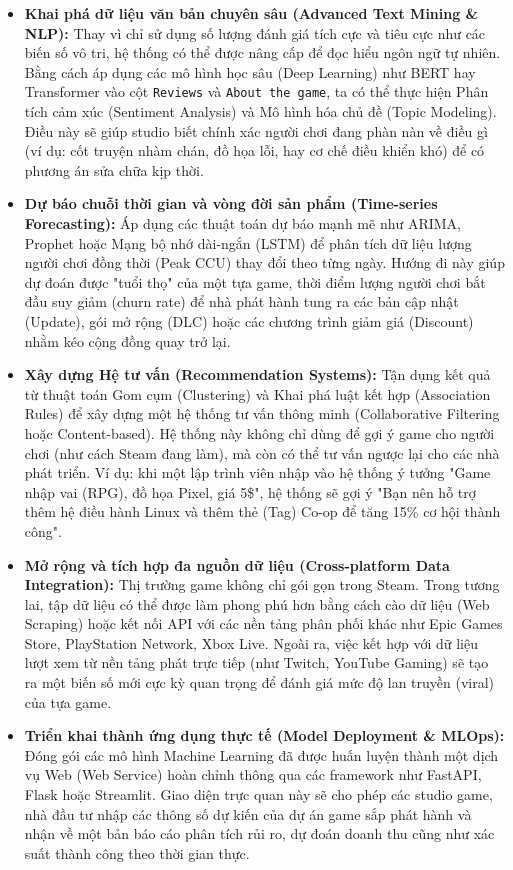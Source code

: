 \begin{itemize}
    \item \textbf{Khai phá dữ liệu văn bản chuyên sâu (Advanced Text Mining \& NLP):} Thay vì chỉ sử dụng số lượng đánh giá tích cực và tiêu cực như các biến số vô tri, hệ thống có thể được nâng cấp để đọc hiểu ngôn ngữ tự nhiên. Bằng cách áp dụng các mô hình học sâu (Deep Learning) như BERT hay Transformer vào cột \texttt{Reviews} và \texttt{About the game}, ta có thể thực hiện Phân tích cảm xúc (Sentiment Analysis) và Mô hình hóa chủ đề (Topic Modeling). Điều này sẽ giúp studio biết chính xác người chơi đang phàn nàn về điều gì (ví dụ: cốt truyện nhàm chán, đồ họa lỗi, hay cơ chế điều khiển khó) để có phương án sửa chữa kịp thời.
    
    \item \textbf{Dự báo chuỗi thời gian và vòng đời sản phẩm (Time-series Forecasting):} Áp dụng các thuật toán dự báo mạnh mẽ như ARIMA, Prophet hoặc Mạng bộ nhớ dài-ngắn (LSTM) để phân tích dữ liệu lượng người chơi đồng thời (Peak CCU) thay đổi theo từng ngày. Hướng đi này giúp dự đoán được "tuổi thọ" của một tựa game, thời điểm lượng người chơi bắt đầu suy giảm (churn rate) để nhà phát hành tung ra các bản cập nhật (Update), gói mở rộng (DLC) hoặc các chương trình giảm giá (Discount) nhằm kéo cộng đồng quay trở lại.
    
    \item \textbf{Xây dựng Hệ tư vấn (Recommendation Systems):} Tận dụng kết quả từ thuật toán Gom cụm (Clustering) và Khai phá luật kết hợp (Association Rules) để xây dựng một hệ thống tư vấn thông minh (Collaborative Filtering hoặc Content-based). Hệ thống này không chỉ dùng để gợi ý game cho người chơi (như cách Steam đang làm), mà còn có thể tư vấn ngược lại cho các nhà phát triển. Ví dụ: khi một lập trình viên nhập vào hệ thống ý tưởng "Game nhập vai (RPG), đồ họa Pixel, giá 5\$", hệ thống sẽ gợi ý "Bạn nên hỗ trợ thêm hệ điều hành Linux và thêm thẻ (Tag) Co-op để tăng 15\% cơ hội thành công".
    
    \item \textbf{Mở rộng và tích hợp đa nguồn dữ liệu (Cross-platform Data Integration):} Thị trường game không chỉ gói gọn trong Steam. Trong tương lai, tập dữ liệu có thể được làm phong phú hơn bằng cách cào dữ liệu (Web Scraping) hoặc kết nối API với các nền tảng phân phối khác như Epic Games Store, PlayStation Network, Xbox Live. Ngoài ra, việc kết hợp với dữ liệu lượt xem từ nền tảng phát trực tiếp (như Twitch, YouTube Gaming) sẽ tạo ra một biến số mới cực kỳ quan trọng để đánh giá mức độ lan truyền (viral) của tựa game.
    
    \item \textbf{Triển khai thành ứng dụng thực tế (Model Deployment \& MLOps):} Đóng gói các mô hình Machine Learning đã được huấn luyện thành một dịch vụ Web (Web Service) hoàn chỉnh thông qua các framework như FastAPI, Flask hoặc Streamlit. Giao diện trực quan này sẽ cho phép các studio game, nhà đầu tư nhập các thông số dự kiến của dự án game sắp phát hành và nhận về một bản báo cáo phân tích rủi ro, dự đoán doanh thu cũng như xác suất thành công theo thời gian thực.
\end{itemize}







